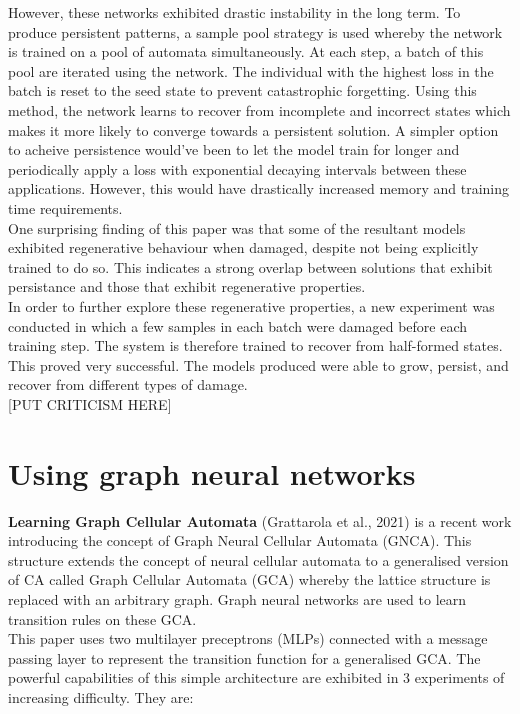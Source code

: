 However, these networks exhibited drastic instability in the long term.
To produce persistent patterns, a sample pool strategy is used whereby the network is trained on a pool of automata simultaneously.
At each step, a batch of this pool are iterated using the network.
The individual with the highest loss in the batch is reset to the seed state to prevent catastrophic forgetting. 
Using this method, the network learns to recover from incomplete and incorrect states which makes it more likely to converge towards a persistent solution.
A simpler option to acheive persistence would've been to let the model train for longer and periodically apply a loss with exponential decaying intervals between these applications.
However, this would have drastically increased memory and training time requirements.\\

One surprising finding of this paper was that some of the resultant models exhibited regenerative behaviour when damaged, despite not being explicitly trained to do so. 
This indicates a strong overlap between solutions that exhibit persistance and those that exhibit regenerative properties.\\

In order to further explore these regenerative properties, a new experiment was conducted in which a few samples in each batch were damaged before each training step. 
The system is therefore trained to recover from half-formed states.
This proved very successful. The models produced were able to grow, persist, and recover from different types of damage.\\

[PUT CRITICISM HERE]

\section{Using graph neural networks}
\label{sec: using-gnn}

\noindent
\textbf{Learning Graph Cellular Automata} (Grattarola et al., 2021) \cite{grattarola2021learning} is a recent work introducing the concept of Graph Neural Cellular Automata (GNCA).
This structure extends the concept of neural cellular automata to a generalised version of CA called Graph Cellular Automata (GCA) whereby the lattice structure is replaced with an arbitrary graph.
Graph neural networks are used to learn transition rules on these GCA.\\

This paper uses two multilayer preceptrons (MLPs) connected with a message passing layer to represent the transition function for a generalised GCA.
The powerful capabilities of this simple architecture are exhibited in 3 experiments of increasing difficulty. They are:


